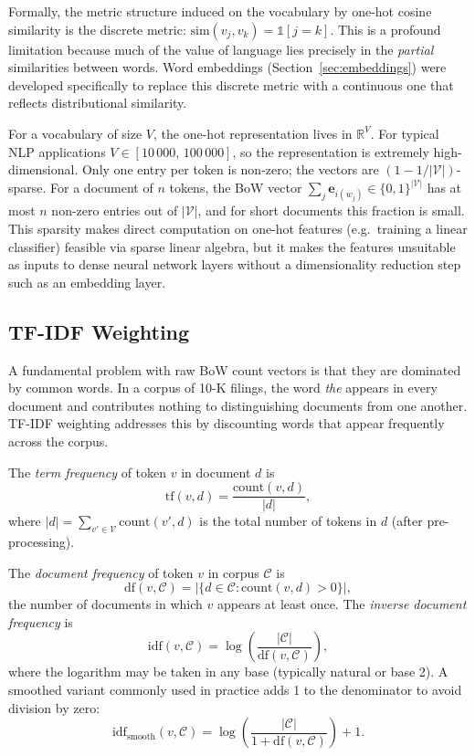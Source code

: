 \begin{deepdive}
Formally, the metric structure induced on the vocabulary by one-hot cosine similarity
is the discrete metric: $\mathrm{sim}(v_j, v_k) = \mathbb{1}[j = k]$.  This is a
profound limitation because much of the value of language lies precisely in the
\emph{partial} similarities between words.  Word embeddings (Section~\ref{sec:embeddings})
were developed specifically to replace this discrete metric with a continuous one that
reflects distributional similarity.

For a vocabulary of size $V$, the one-hot representation lives in $\mathbb{R}^V$.  For
typical NLP applications $V \in [10\,000,\, 100\,000]$, so the representation is
extremely high-dimensional.  Only one entry per token is non-zero; the vectors are
$(1 - 1/|\mathcal{V}|)$-sparse.  For a document of $n$ tokens, the BoW vector
$\sum_j \mathbf{e}_{i(w_j)} \in \{0,1\}^{|\mathcal{V}|}$ has at most $n$ non-zero entries out of $|\mathcal{V}|$, and for short
documents this fraction is small.  This sparsity makes direct computation on one-hot
features (e.g.\ training a linear classifier) feasible via sparse linear algebra, but it
makes the features unsuitable as inputs to dense neural network layers without a
dimensionality reduction step such as an embedding layer.

\subsection{TF-IDF Weighting}
\label{sec:classical-tfidf}

A fundamental problem with raw BoW count vectors is that they are dominated by common
words.  In a corpus of 10-K filings, the word \textit{the} appears in every document
and contributes nothing to distinguishing documents from one another.  TF-IDF weighting
addresses this by discounting words that appear frequently across the corpus.

\begin{definition}
\label{def:tf}
The \emph{term frequency} of token $v$ in document $d$ is
\[
  \mathrm{tf}(v, d) = \frac{\mathrm{count}(v, d)}{|d|},
\]
where $|d| = \sum_{v' \in \mathcal{V}} \mathrm{count}(v', d)$ is the total number of
tokens in $d$ (after pre-processing).
\end{definition}

\begin{definition}
\label{def:idf}
The \emph{document frequency} of token $v$ in corpus $\mathcal{C}$ is
\[
  \mathrm{df}(v, \mathcal{C}) = \bigl|\{d \in \mathcal{C} : \mathrm{count}(v, d) > 0\}\bigr|,
\]
the number of documents in which $v$ appears at least once.  The \emph{inverse document
frequency} is
\[
  \mathrm{idf}(v, \mathcal{C}) = \log\!\left(\frac{|\mathcal{C}|}{\mathrm{df}(v, \mathcal{C})}\right),
\]
where the logarithm may be taken in any base (typically natural or base 2).  A
smoothed variant commonly used in practice adds 1 to the denominator to avoid division
by zero:
\[
  \mathrm{idf}_{\text{smooth}}(v, \mathcal{C})
    = \log\!\left(\frac{|\mathcal{C}|}{1 + \mathrm{df}(v, \mathcal{C})}\right) + 1.
\]
\end{definition}


\end{deepdive}
